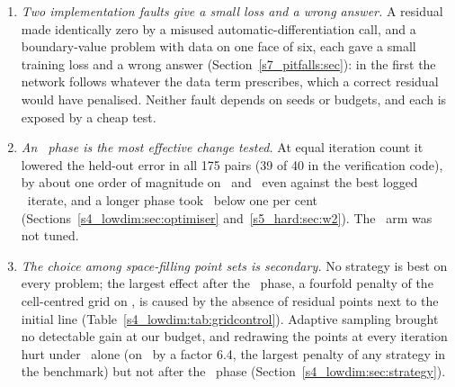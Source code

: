 \begin{enumerate}[label=(\arabic*),leftmargin=*]
\item \emph{Two implementation faults give a small loss and a wrong answer.} A residual made
identically zero by a misused automatic-differentiation call, and a boundary-value problem with data
on one face of six, each gave a small training loss and a wrong answer (Section~\ref{s7_pitfalls:sec}): in the
first the network follows whatever the data term prescribes, which a correct residual would have
penalised. Neither fault depends on seeds or budgets, and each is exposed by a cheap test.
\item \emph{An \LBFGS\ phase is the most effective change tested.} At equal iteration count it
lowered the held-out error in all 175 pairs (39 of 40 in the verification code), by about one order
of magnitude on \PH\ and \PLtwo\ even against the best logged \Adam\ iterate, and a longer phase took
\PWtwo\ below one per cent (Sections~\ref{s4_lowdim:sec:optimiser} and~\ref{s5_hard:sec:w2}). The
\Adam\ arm was not tuned.
\item \emph{The choice among space-filling point sets is secondary.} No strategy is best on every
problem; the largest effect after the \LBFGS\ phase, a fourfold penalty of the cell-centred grid on
\PH, is caused by the absence of residual points next to the initial line
(Table~\ref{s4_lowdim:tab:gridcontrol}). Adaptive sampling brought no detectable gain at our budget,
and redrawing the points at every iteration hurt under \Adam\ alone (on \PLtwo\ by a factor 6.4,
the largest penalty of any strategy in the benchmark) but not after the \LBFGS\ phase (Section~\ref{s4_lowdim:sec:strategy}).

\end{enumerate}

